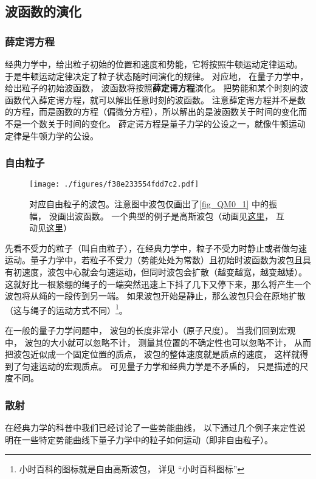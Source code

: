 \subsection{波函数的演化}
\subsubsection{薛定谔方程}
经典力学中，给出粒子初始的位置和速度和势能，它将按照牛顿运动定律运动。 于是牛顿运动定律决定了粒子状态随时间演化的规律。 对应地， 在量子力学中， 给出粒子的初始波函数， 波函数将按照\textbf{薛定谔方程}演化。 把势能和某个时刻的波函数代入薛定谔方程，就可以解出任意时刻的波函数。 注意薛定谔方程并不是数的方程，而是函数的方程（偏微分方程），所以解出的是波函数关于时间的变化而不是一个数关于时间的变化。 薛定谔方程是量子力学的公设之一，就像牛顿运动定律是牛顿力学的公设。

\subsubsection{自由粒子}

\begin{figure}[ht]
\centering
\texttt{[image: ./figures/f38e233554fdd7c2.pdf]}
\caption{对应自由粒子的波包。注意图中波包仅画出了\autoref{fig_QM0_1} 中的振幅， 没画出波函数。 一个典型的例子是高斯波包（动画见\href{https://wuli.wiki/apps/free_gauss.html}{这里}， 互动见\href{https://wuli.wiki/apps/gausWP.html}{这里}）} \label{fig_QM0_2}
\end{figure}

先看不受力的粒子（叫自由粒子），在经典力学中，粒子不受力时静止或者做匀速运动。量子力学中，若粒子不受力（势能处处为常数）且初始时波函数为波包且具有初速度，波包中心就会匀速运动，但同时波包会扩散（越变越宽，越变越矮）。这就好比一根紧绷的绳子的一端突然迅速上下抖了几下又停下来，那么将产生一个波包将从绳的一段传到另一端。 如果波包开始是静止，那么波包只会在原地扩散（这与绳子的运动方式不同）\footnote{小时百科的图标就是自由高斯波包， 详见 “小时百科图标”}。

在一般的量子力学问题中， 波包的长度非常小（原子尺度）。 当我们回到宏观中， 波包的大小就可以忽略不计， 测量其位置的不确定性也可以忽略不计， 从而把波包近似成一个固定位置的质点， 波包的整体速度就是质点的速度， 这样就得到了匀速运动的宏观质点。 可见量子力学和经典力学是不矛盾的， 只是描述的尺度不同。

\subsubsection{散射}
在经典力学的科普中我们已经讨论了一些势能曲线， 以下通过几个例子来定性说明在一些特定势能曲线下量子力学中的粒子如何运动（即非自由粒子）。

